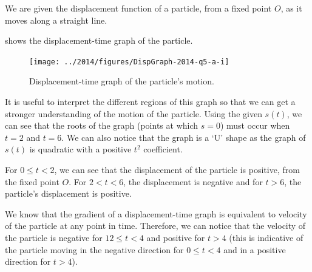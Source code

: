 %
%
%


\begin{subquestions}
	
\subquestion

We are given the displacement function of a particle, from a fixed point $O$, as it moves along a straight line.

\begin{subsubquestions}
	
\subsubquestion

 shows the displacement-time graph of the particle.
\begin{figure}[H]
	\begin{center}
		\texttt{[image: ../2014/figures/DispGraph-2014-q5-a-i]}
		\caption{\label{2014:q5:SGraph1} Displacement-time graph of the particle's motion.}
	\end{center}
\end{figure}

It is useful to interpret the different regions of this graph so that we can get a stronger understanding of the motion of the particle. Using the given $s(t)$, we can see that the roots of the graph (points at which $s=0$) must occur when $t=2$ and $t=6$. We can also notice that the graph is a `U' shape as the graph of $s(t)$ is quadratic with a positive $t^2$ coefficient. 

For $0 \leq t < 2$, we can see that the displacement of the particle is positive, from the fixed point $O$. For $2 < t < 6$, the displacement is negative and for $t>6$, the particle's displacement is positive. 

We know that the gradient of a displacement-time graph is equivalent to velocity of the particle at any point in time. Therefore, we can notice that the velocity of the particle is negative for $12 \leq t < 4$ and positive for $t>4$ (this is indicative of the particle moving in the negative direction for $0 \leq t < 4$ and in a positive direction for $t>4$). 


\end{subsubquestions}
\end{subquestions}
